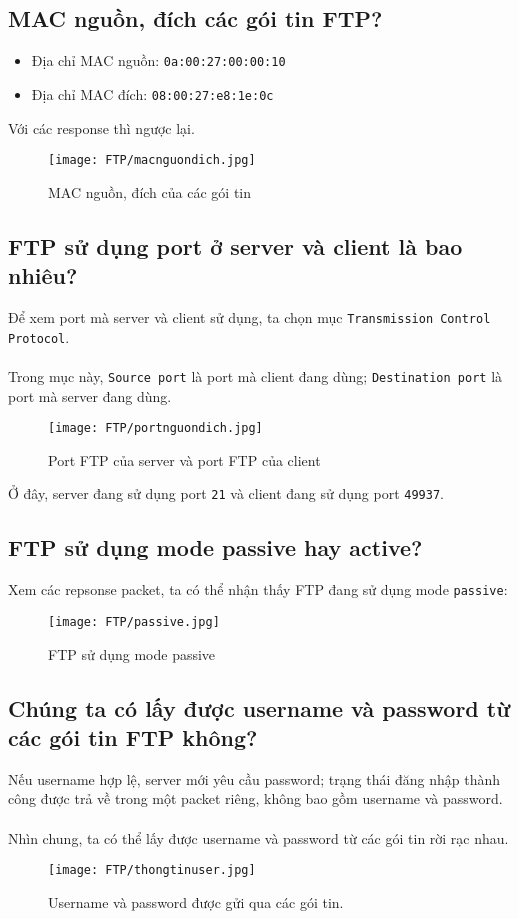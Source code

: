 \documentclass[]{article}
\begin{document}
\subsection{MAC nguồn, đích các gói tin FTP?}
\begin{itemize}
\item Địa chỉ MAC nguồn: \texttt{0a:00:27:00:00:10}
\item Địa chỉ MAC đích: \texttt{08:00:27:e8:1e:0c}
\end{itemize}
Với các response thì ngược lại.
\begin{figure}[H]
\centering
\texttt{[image: FTP/macnguondich.jpg]}
\caption{MAC nguồn, đích của các gói tin}
\end{figure}

\subsection{FTP sử dụng port ở server và client là bao nhiêu?}
Để xem port mà server và client sử dụng, ta chọn mục \texttt{Transmission Control Protocol}.
\\\\
Trong mục này, \texttt{Source port} là port mà client đang dùng; \texttt{Destination port} là port mà server đang dùng.
\begin{figure}[H]
\centering
\texttt{[image: FTP/portnguondich.jpg]}
\caption{Port FTP của server và port FTP của client}
\end{figure}
Ở đây, server đang sử dụng port \texttt{21} và client đang sử dụng port \texttt{49937}.

\subsection{FTP sử dụng mode passive hay active?}
Xem các repsonse packet, ta có thể nhận thấy FTP đang sử dụng mode \texttt{passive}:
\begin{figure}[H]
\centering
\texttt{[image: FTP/passive.jpg]}
\caption{FTP sử dụng mode passive}
\end{figure}

\subsection{Chúng ta có lấy được username và password từ các gói tin FTP không?}
Nếu username hợp lệ, server mới yêu cầu password; trạng thái đăng nhập thành công được trả về trong một packet riêng, không bao gồm username và password.
\\\\
Nhìn chung, ta có thể lấy được username và password từ các gói tin rời rạc nhau.
\begin{figure}[H]
\centering
\texttt{[image: FTP/thongtinuser.jpg]}
\caption{Username và password được gửi qua các gói tin.}
\end{figure}
\end{document}
